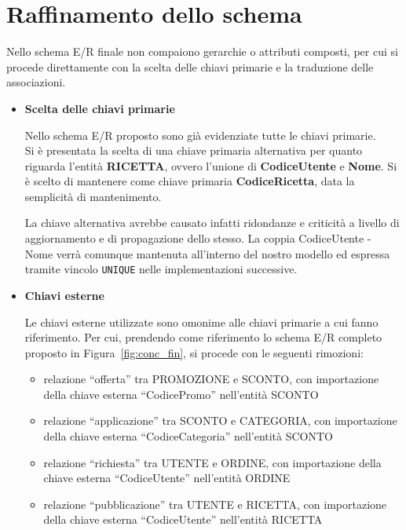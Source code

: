 \vspace{3em}

\section{Raffinamento dello schema}

Nello schema E/R finale non compaiono gerarchie o attributi composti, per cui si procede direttamente con la scelta delle chiavi primarie e la traduzione delle associazioni.

\begin{itemize}[leftmargin=0.8cm, itemsep=1em]

    \item \textbf{Scelta delle chiavi primarie}
    
    Nello schema E/R proposto sono già evidenziate tutte le chiavi primarie. \\
    Si è presentata la scelta di una chiave primaria alternativa per quanto riguarda l’entità \textbf{RICETTA}, ovvero l’unione di \textbf{CodiceUtente} e \textbf{Nome}. Si è scelto di mantenere come chiave primaria \textbf{CodiceRicetta}, data la semplicità di mantenimento. 
    
    La chiave alternativa avrebbe causato infatti ridondanze e criticità a livello di aggiornamento e di propagazione dello stesso. La coppia CodiceUtente - Nome verrà comunque mantenuta all'interno del nostro modello ed espressa tramite vincolo \texttt{UNIQUE} nelle implementazioni successive.

    \item \textbf{Chiavi esterne}
    
    Le chiavi esterne utilizzate sono omonime alle chiavi primarie a cui fanno riferimento. Per cui, prendendo come riferimento lo schema E/R completo proposto in Figura~\ref{fig:conc_fin}, si procede con le seguenti rimozioni:

    \begin{itemize}[label=$\circ$, leftmargin=0.8cm, itemsep=0.4em]
        \item relazione ``offerta'' tra PROMOZIONE e SCONTO, con importazione della chiave esterna ``CodicePromo'' nell'entità SCONTO
        \item relazione ``applicazione'' tra SCONTO e CATEGORIA, con importazione della chiave esterna ``CodiceCategoria'' nell'entità SCONTO
        \item relazione ``richiesta'' tra UTENTE e ORDINE, con importazione della chiave esterna ``CodiceUtente'' nell'entità ORDINE
        \item relazione ``pubblicazione'' tra UTENTE e RICETTA, con importazione della chiave esterna ``CodiceUtente'' nell'entità RICETTA
    \end{itemize}

\end{itemize}

